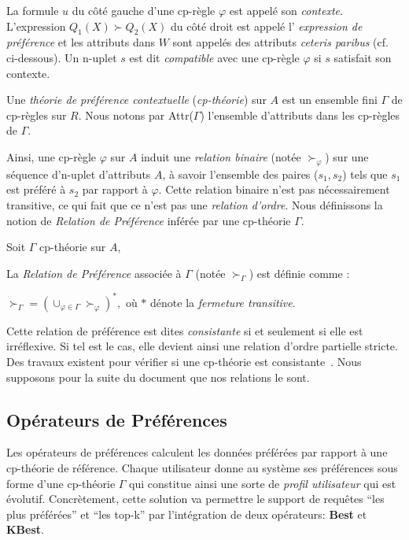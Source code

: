 La formule $u$ du côté gauche d'une cp-règle $\varphi$ est appelé son \textit{contexte}. L'expression $Q_1(X) \succ Q_2(X)$ du côté droit est appelé l' \textit{expression de préférence} et les attributs dans $W$ sont appelés des attributs \textit{ceteris paribus} (cf. ci-dessous). Un n-uplet $s$ est dit \textit{compatible} avec une cp-règle $\varphi$ si $s$ satisfait son contexte.

Une \textit{théorie de préférence contextuelle} (\textit{cp-théorie}) sur $A$ est un ensemble fini $\Gamma$ de cp-règles sur $R$. Nous notons par Attr($\Gamma$) l'ensemble d'attributs dans les cp-règles de $\Gamma$.

Ainsi, une cp-règle $\varphi$ sur $A$ induit une \textit{relation binaire} (notée $\succ_\varphi$) sur une séquence d'n-uplet d'attributs $A$, à savoir l'ensemble des paires ($s_1,s_2$) tels que $s_1$ est préféré à $s_2$ par rapport à $\varphi$. Cette relation binaire n'est pas nécessairement transitive, ce qui fait que ce n'est pas une \textit{relation d'ordre}. Nous définissons la notion de \textit{Relation de Préférence} inférée par une cp-théorie $\Gamma$.

\begin{defi}
Soit $\Gamma$ cp-théorie sur $A$,

La \textit{Relation de Préférence} associée à $\Gamma$ (notée $\succ_\Gamma$) est définie comme :
\begin{center} $\succ_\Gamma = (\cup_{\varphi \in \Gamma} \succ_\varphi)^*,$ o\`u $*$ dénote la \textit{fermeture transitive}.\end{center}
\end{defi}

Cette relation de préférence est dites \textit{consistante} si et seulement si elle est irréflexive. Si tel est le cas, elle devient ainsi une relation d'ordre partielle stricte. Des travaux existent pour vérifier si une cp-théorie est consistante~\cite{Wilson:cpnet}. Nous supposons pour la suite du document que nos relations le sont.

\subsection{Opérateurs de Préférences}
Les opérateurs de préférences calculent les données préférées par rapport à une cp-th\'eorie de référence. Chaque utilisateur donne au système ses préférences sous forme d'une cp-th\'eorie $\Gamma$ qui constitue ainsi une sorte de \textit{profil utilisateur} qui est évolutif. Concrètement, cette solution va permettre le support de requêtes 
\enquote{les plus préférées} et \enquote{les top-k} par l'intégration de deux opérateurs: \textbf{Best} et \textbf{KBest}.

